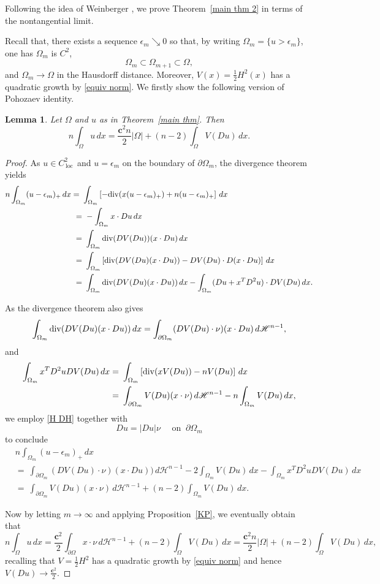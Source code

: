 \documentclass[reqno,11pt]{amsart}
\makeatletter
\def\loc{{\mathop\mathrm{\,loc\,}}}
\def\ez{\epsilon}
\newtheorem{lem}[thm]{Lemma}%
\numberwithin{equation}{section}
\theoremstyle{remark}
\makeatother
\begin{document}
Following the idea of  Weinberger \cite{W1971}, we prove Theorem~\ref{main thm 2} in terms of the nontangential limit.  

Recall that, there exists a sequence $\ez_m\searrow 0$ so that, 
by writing $\Omega_{m}=\{u>\ez_m\}$, one has $\Omega_m$ is $C^2$,
$$\Omega_m\subset \Omega_{m+1}\subset \Omega, $$
and $\Omega_m\to \Omega$ in the Hausdorff distance. 
Moreover, $V(x)=\frac 1 2 H^2(x)$ has a quadratic growth by \eqref{equiv norm}. We firstly show the following version of Pohozaev identity. 
\begin{lem}\label{Pohozaev}
    Let $\Omega$ and $u$ as in Theorem~\ref{main thm}. Then 
    $$n\int_{\Omega}u\,dx = \frac{\mathbf{c}^2 n}2 |\Omega| + (n-2)\int_{\Omega} V(Du)\, dx. $$
\end{lem}
\begin{proof}
As $u\in C^2_\loc$ and $u=\ez_m$ on the boundary of $\partial\Omega_m$, the divergence theorem yields
\begin{align*}
n\int_{\Omega_m} (u-\ez_m)_+\, dx=\ & \int_{\Omega_m} \left[-{\rm div}(x (u-\ez_m)_+) + n (u-\ez_m)_+\right]\, dx\\
=&\ -\int_{\Omega_m} x\cdot Du\, dx\\
=&\ \int_{\Omega_m} {\rm div}(DV(Du)) (x\cdot Du)\,dx\\
= & \  \int_{\Omega_m} \left[{\rm div}(DV(Du) (x\cdot Du))  -   DV(Du)\cdot D(x\cdot Du)\right]\, dx\\
= & \  \int_{\Omega_m} {\rm div}(DV(Du) (x\cdot Du))\,dx - \int_{\Omega_m}  (Du+x^T D^2u )\cdot DV(Du)\, dx.
\end{align*}

As the divergence theorem also gives 
$$\int_{\Omega_m} {\rm div}(DV(Du) (x\cdot Du))\,dx = \int_{\partial \Omega_m} (DV(Du)\cdot \nu) (x\cdot Du)\,d\mathscr H^{n-1},$$
and
\begin{align*}
    \int_{\Omega_m}x^T D^2u DV(Du)\, dx=& \ \int_{\Omega_m} \left[ {\rm div}(x V(Du))-nV(Du)\right]\, dx \\
    = &\ \int_{\partial\Omega_m} V(Du) (x\cdot \nu)\, d\mathscr H^{n-1} - n \int_{\Omega_m}V(Du)\, dx,
\end{align*} 
we employ \eqref{H DH} together with 
$$Du=|Du| \nu \quad \text{ on } \ \partial \Omega_m $$
to conclude
\begin{align*}
    &n\int_{\Omega_m} (u-\ez_m)_+\, dx \\
    &= \ \int_{\partial \Omega_m} (DV(Du)\cdot \nu) (x\cdot Du))\,d\mathscr H^{n-1} - 2 \int_{\Omega_m} V(Du)\, dx -\int_{\Omega_m} x^T D^2u DV(Du) \, dx\\
    &= \ \int_{\partial \Omega_m}  V(Du) (x\cdot \nu)\,d\mathscr H^{n-1} +(n-2) \int_{\Omega_m} V(Du)\, dx.
\end{align*}

Now by letting $m\to \infty$ and applying Proposition~\ref{KP}, we eventually obtain that
$$n\int_{\Omega}u \, dx = \frac{\mathbf{c}^2}{2} \int_{\partial \Omega}   x\cdot \nu\,d\mathscr H^{n-1} +(n-2) \int_{\Omega} V(Du)\, dx=  \frac{\mathbf{c}^2 n}{2}|\Omega| + (n-2) \int_{\Omega} V(Du)\, dx,$$
recalling that $V=\frac 1 2 H^2$ has a quadratic growth by \eqref{equiv norm}  and hence $V(Du)\to \frac {\mathbf c^2} 2$.
\end{proof}
\end{document}
